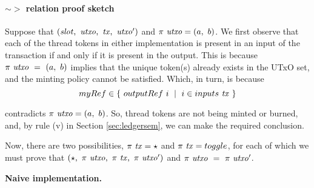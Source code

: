 %



\paragraph{$\sim >$ relation proof sketch }
\label{sec:toggle-sim}

Suppose that $(\mathit{slot},~\mathit{utxo},~\mathit{tx},~\mathit{utxo'})$
and $\pi~\mathit{utxo} = (a,~b)$.
We first observe that each of the thread tokens in either implementation
is present in an input of the transaction if and only
if it is present in the output. This is because
$\pi~\mathit{utxo}~=~(a,~b)$ implies that the unique token(s) already exists in the UTxO set, and
the minting policy cannot be satisfied. Which, in turn, is because
\[\mathsf{myRef} \in \{ ~\outputref~i~\mid~i \in \inputs~\var{tx}~\} \]

contradicts $\pi~\mathit{utxo} = (a,~b)$.
So, thread tokens are not being minted or burned, and, by rule (v) in Section \ref{sec:ledgersem},
we can make the required conclusion.

Now, there are two possibilities, $\pi~\mathit{tx} = \star$
and $\pi~\var{tx} = \toggle$, for each of which we must prove that
$(\star,~\pi~\mathit{utxo},~\pi~\mathit{tx},~\pi~\mathit{utxo'})$ and $\pi~\mathit{utxo}~=~\pi~\mathit{utxo'}$.

\textbf{Naive implementation. }

